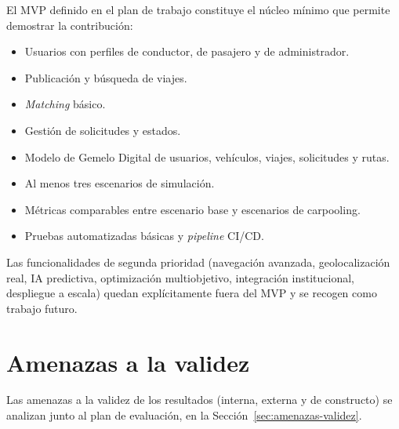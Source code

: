 El MVP definido en el plan de trabajo constituye el núcleo mínimo que permite demostrar la contribución:
\begin{itemize}
    \item Usuarios con perfiles de conductor, de pasajero y de administrador.
    \item Publicación y búsqueda de viajes.
    \item \textit{Matching} básico.
    \item Gestión de solicitudes y estados.
    \item Modelo de Gemelo Digital de usuarios, vehículos, viajes, solicitudes y rutas.
    \item Al menos tres escenarios de simulación.
    \item Métricas comparables entre escenario base y escenarios de carpooling.
    \item Pruebas automatizadas básicas y \textit{pipeline} CI/CD.
\end{itemize}

Las funcionalidades de segunda prioridad (navegación avanzada, geolocalización real, IA predictiva, optimización multiobjetivo, integración institucional, despliegue a escala) quedan explícitamente fuera del MVP y se recogen como trabajo futuro.

\section{Amenazas a la validez}

Las amenazas a la validez de los resultados (interna, externa y de constructo) se analizan junto al plan de evaluación, en la Sección~\ref{sec:amenazas-validez}.

